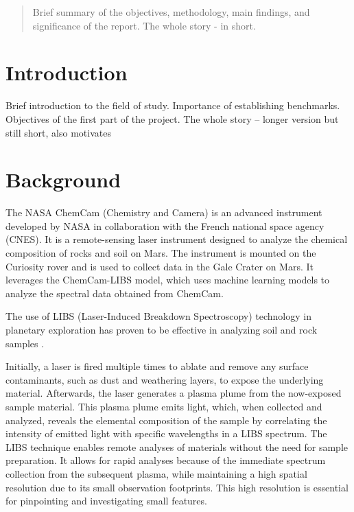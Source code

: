 \begin{abstract}
     Brief summary of the objectives, methodology, main findings, and significance of the report. The whole story - in short.
\end{abstract}



\section{Introduction}
Brief introduction to the field of study.
Importance of establishing benchmarks.
Objectives of the first part of the project.
The whole story – longer version but still short, also motivates

\section{Background}

The NASA ChemCam (Chemistry and Camera) is an advanced instrument developed by NASA in collaboration with the French national space agency (CNES).
It is a remote-sensing laser instrument designed to analyze the chemical composition of rocks and soil on Mars\cite{chemcam_nasa_website}.
The instrument is mounted on the Curiosity rover and is used to collect data in the Gale Crater on Mars\cite{curiosity_nasa_website}.
It leverages the ChemCam-LIBS model, which uses machine learning models to analyze the spectral data obtained from ChemCam.\cite{andersonImprovedAccuracyQuantitative2017}\cite{cleggRecalibrationMarsScience2017}

The use of LIBS (Laser-Induced Breakdown Spectroscopy) technology in planetary exploration has proven to be effective in analyzing soil and rock samples \cite{knight_characterization_2000}.

Initially, a laser is fired multiple times to ablate and remove any surface contaminants, such as dust and weathering layers, to expose the underlying material.
Afterwards, the laser generates a plasma plume from the now-exposed sample material.
This plasma plume emits light, which, when collected and analyzed, reveals the elemental composition of the sample by correlating the intensity of emitted light with specific wavelengths in a LIBS spectrum.
The LIBS technique enables remote analyses of materials without the need for sample preparation.
It allows for rapid analyses because of the immediate spectrum collection from the subsequent plasma, while maintaining a high spatial resolution due to its small observation footprints.
This high resolution is essential for pinpointing and investigating small features. \cite{wiens_chemcam_2012}

